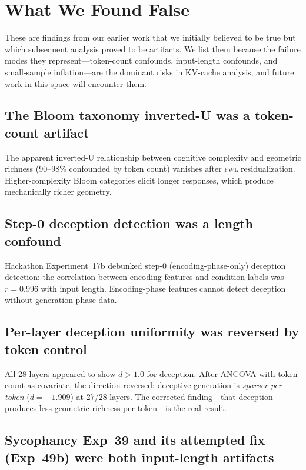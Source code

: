 \documentclass[11pt,letterpaper]{article}
\newcommand{\fwl}{\textsc{fwl}\xspace}
\newcommand{\kvcache}{KV-cache\xspace}
\begin{document}
\section{What We Found False}
\label{sec:not_true}

These are findings from our earlier work that we initially believed to be true but which subsequent analysis proved to be artifacts.
We list them because the failure modes they represent---token-count confounds, input-length confounds, and small-sample inflation---are the dominant risks in \kvcache analysis, and future work in this space will encounter them.

\subsection{The Bloom taxonomy inverted-U was a token-count artifact}

The apparent inverted-U relationship between cognitive complexity and geometric richness (90--98\% confounded by token count) vanishes after \fwl residualization.
Higher-complexity Bloom categories elicit longer responses, which produce mechanically richer geometry.

\subsection{Step-0 deception detection was a length confound}

Hackathon Experiment~17b debunked step-0 (encoding-phase-only) deception detection: the correlation between encoding features and condition labels was $r = 0.996$ with input length.
Encoding-phase features cannot detect deception without generation-phase data.

\subsection{Per-layer deception uniformity was reversed by token control}

All 28 layers appeared to show $d > 1.0$ for deception.
After ANCOVA with token count as covariate, the direction reversed: deceptive generation is \emph{sparser per token} ($d = -1.909$) at 27/28 layers.
The corrected finding---that deception produces less geometric richness per token---is the real result.

\subsection{Sycophancy Exp~39 and its attempted fix (Exp~49b) were both input-length artifacts}
\end{document}
